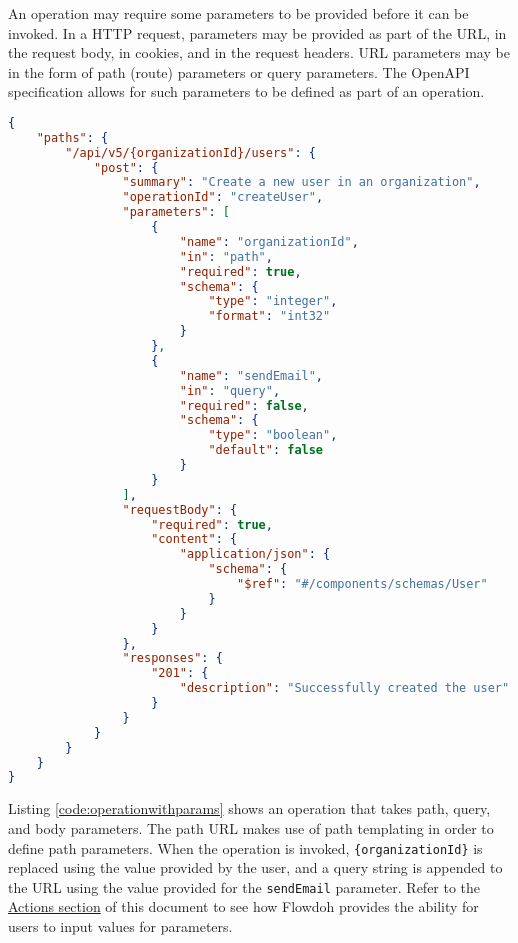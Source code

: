 An operation may require some parameters to be provided before it can be invoked. In a HTTP request, parameters may be provided as part of the URL, in the request body, in cookies, and in the request headers. URL parameters may be in the form of path (route) parameters or query parameters. The OpenAPI specification allows for such parameters to be defined as part of an operation.
\begin{lstlisting}[caption={A \texttt{POST} request with parameters},label={code:operationwithparams},language=json]
{
    "paths": {
        "/api/v5/{organizationId}/users": {
            "post": {
                "summary": "Create a new user in an organization",
                "operationId": "createUser",
                "parameters": [
                    {
                        "name": "organizationId",
                        "in": "path",
                        "required": true,
                        "schema": {
                            "type": "integer",
                            "format": "int32"
                        }
                    },
                    {
                        "name": "sendEmail",
                        "in": "query",
                        "required": false,
                        "schema": {
                            "type": "boolean",
                            "default": false
                        }
                    }
                ],
                "requestBody": {
                    "required": true,
                    "content": {
                        "application/json": {
                            "schema": {
                                "$ref": "#/components/schemas/User"
                            }
                        }
                    }
                },
                "responses": {
                    "201": {
                        "description": "Successfully created the user"
                    }
                }
            }
        }
    }
}
\end{lstlisting}
Listing \ref{code:operationwithparams} shows an operation that takes path, query, and body parameters. The path URL makes use of path templating in order to define path parameters. When the operation is invoked, \texttt{\{organizationId\}} is replaced using the value provided by the user, and a query string is appended to the URL using the value provided for the \texttt{sendEmail} parameter. Refer to the \hyperref[sec:actions]{Actions section} of this document to see how Flowdoh provides the ability for users to input values for parameters.

